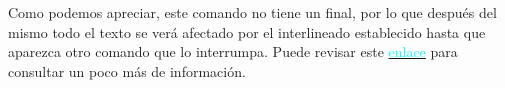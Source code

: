 Como podemos apreciar, este comando no tiene un final, por lo que después del mismo todo el texto se verá afectado por el interlineado establecido hasta que aparezca otro comando que lo interrumpa. Puede revisar este \href{http://minisconlatex.blogspot.com/2015/02/como-editar-el-interlineado-en-latex.html}{\textcolor{cyan}{enlace}} para consultar un poco más de información.
